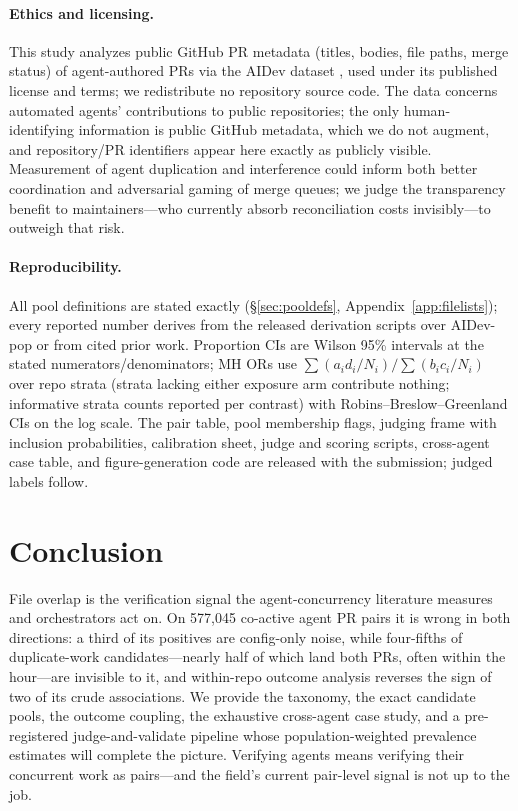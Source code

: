 \documentclass{article}
\begin{document}
\paragraph{Ethics and licensing.}
This study analyzes public GitHub PR metadata (titles, bodies, file paths, merge status) of agent-authored PRs via the AIDev dataset \citep{li2026aidev}, used under its published license and terms; we redistribute no repository source code. The data concerns automated agents' contributions to public repositories; the only human-identifying information is public GitHub metadata, which we do not augment, and repository/PR identifiers appear here exactly as publicly visible. Measurement of agent duplication and interference could inform both better coordination and adversarial gaming of merge queues; we judge the transparency benefit to maintainers---who currently absorb reconciliation costs invisibly---to outweigh that risk.

\paragraph{Reproducibility.}
All pool definitions are stated exactly (\S\ref{sec:pooldefs}, Appendix~\ref{app:filelists}); every reported number derives from the released derivation scripts over AIDev-pop or from cited prior work. Proportion CIs are Wilson 95\% intervals at the stated numerators/denominators; MH ORs use $\sum(a_i d_i/N_i)/\sum(b_i c_i/N_i)$ over repo strata (strata lacking either exposure arm contribute nothing; informative strata counts reported per contrast) with Robins--Breslow--Greenland CIs on the log scale. The pair table, pool membership flags, judging frame with inclusion probabilities, calibration sheet, judge and scoring scripts, cross-agent case table, and figure-generation code are released with the submission; judged labels follow.

\section{Conclusion}

File overlap is the verification signal the agent-concurrency literature measures and orchestrators act on. On 577{,}045 co-active agent PR pairs it is wrong in both directions: a third of its positives are config-only noise, while four-fifths of duplicate-work candidates---nearly half of which land both PRs, often within the hour---are invisible to it, and within-repo outcome analysis reverses the sign of two of its crude associations. We provide the taxonomy, the exact candidate pools, the outcome coupling, the exhaustive cross-agent case study, and a pre-registered judge-and-validate pipeline whose population-weighted prevalence estimates will complete the picture. Verifying agents means verifying their concurrent work as pairs---and the field's current pair-level signal is not up to the job.
\end{document}
